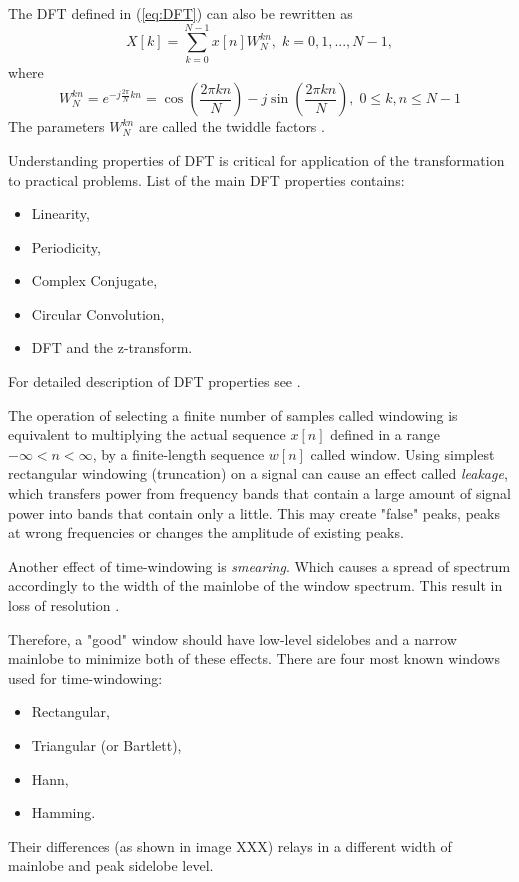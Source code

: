\documentclass[twoside]{ctuthesis}
\theoremstyle{plain}
\theoremstyle{definition}
\theoremstyle{note}
\begin{document}
The DFT defined in (\ref{eq:DFT}) can also be rewritten as
\begin{equation} \label{eq:DFT2}
X[k]=\sum_{k=0}^{N-1}x[n]W^{kn}_{N},\; k = 0, 1, ..., N-1,
\end{equation}
where
\begin{equation} \label{eq:Twiddle}
W^{kn}_{N}=e^{-j \frac{2 \pi}{N} kn}=\cos(\frac{2\pi kn}{N})-j\sin(\frac{2\pi kn}{N}), \;0\leq k,n\leq N-1
\end{equation}
The parameters $W^{kn}_{N}$ are called the twiddle factors \cite{cite:RT_DSP}.
\par
Understanding properties of DFT is critical for application of the transformation to practical problems. List of the main DFT properties contains:
\begin{itemize}
	\setlength{\itemsep}{5pt}
\item Linearity,

\item Periodicity,

\item Complex Conjugate,

\item Circular Convolution,

\item DFT and the z-transform.
\end{itemize}
For detailed description of DFT properties see \cite{cite:2,cite:RT_DSP}.

The operation of selecting a finite number of samples called windowing is equivalent to multiplying the actual sequence $x[n]$ defined in a range $-\infty < n < \infty$, by a finite-length sequence $w[n]$ called window. Using simplest rectangular windowing (truncation) on a signal can cause an effect called \textit{leakage}, which transfers power from frequency bands that contain a large amount of signal power into bands that contain only a little. This may create "false" peaks, peaks at wrong frequencies or changes the amplitude of existing peaks. 

Another effect of time-windowing is \textit{smearing}. Which causes a spread of spectrum accordingly to the width of the mainlobe of the window spectrum. This result in loss of resolution \cite{cite:3} .

Therefore, a "good" window should have low-level sidelobes and a narrow mainlobe to minimize both of these effects. There are four most known windows used for time-windowing: 
\begin{itemize}
	 \setlength{\itemsep}{5pt}
\item Rectangular,
	
\item Triangular (or Bartlett),
	
\item Hann,
	
\item Hamming.
\end{itemize}	
Their differences (as shown in image XXX) relays in a different width of mainlobe and peak sidelobe level.
\end{document}
